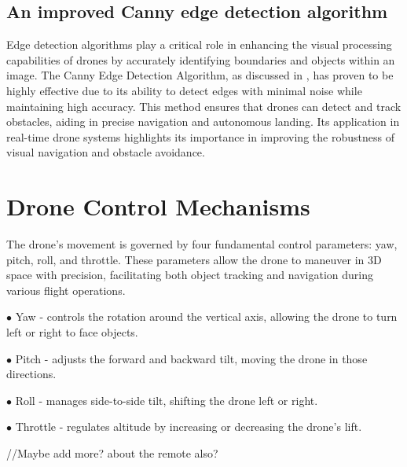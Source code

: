 \documentclass[3p,times]{elsarticle}
\begin{document}
    \subsection{An improved Canny edge detection algorithm}
    Edge detection algorithms play a critical role in enhancing the visual processing capabilities of drones by accurately identifying boundaries and objects within an image. The Canny Edge Detection Algorithm, as discussed in \cite{rong2014improved}, has proven to be highly effective due to its ability to detect edges with minimal noise while maintaining high accuracy. This method ensures that drones can detect and track obstacles, aiding in precise navigation and autonomous landing. Its application in real-time drone systems highlights its importance in improving the robustness of visual navigation and obstacle avoidance.











    \section{Drone Control Mechanisms} \label{sec:framework}
    The drone’s movement is governed by four fundamental control parameters: yaw, pitch, roll, and throttle. These parameters allow the drone to maneuver in 3D space with precision, facilitating both object tracking and navigation during various flight operations.\\
    \begin{description}
        \item $\bullet$ Yaw - controls the rotation around the vertical axis, allowing the drone to turn left or right to face objects.
        \item $\bullet$ Pitch - adjusts the forward and backward tilt, moving the drone in those directions.
        \item $\bullet$ Roll - manages side-to-side tilt, shifting the drone left or right.
        \item $\bullet$ Throttle - regulates altitude by increasing or decreasing the drone’s lift.
    \end{description}
    //Maybe add more? about the remote also?
\end{document}
